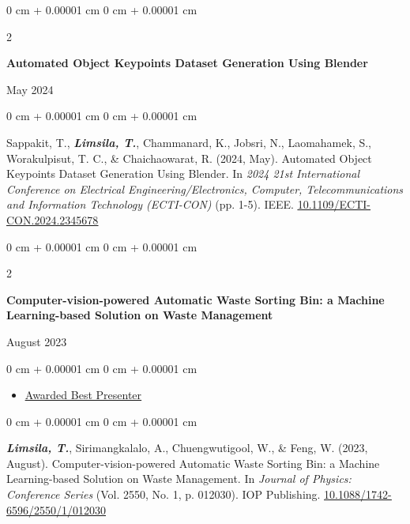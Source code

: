\documentclass[10pt, letterpaper]{article}
\newenvironment{highlights}{
    \begin{itemize}[
        topsep=0.0 cm,
        parsep=0.0 cm,
        partopsep=0pt,
        itemsep=0pt,
        leftmargin=0 cm + 10pt
    ]
}{
    \end{itemize}
} %
\newenvironment{onecolentry}{
    \begin{adjustwidth}{
        0 cm + 0.00001 cm
    }{
        0 cm + 0.00001 cm
    }
}{
    \end{adjustwidth}
} %
\newenvironment{twocolentry}[2][]{
    \onecolentry
    \def\secondColumn{#2}
    \setcolumnwidth{\fill, 4.5 cm}
    \begin{paracol}{2}
}{
    \switchcolumn \raggedleft \secondColumn
    \end{paracol}
    \endonecolentry
} %
\begin{document}
        \vspace{0.30 cm}
        
        \begin{samepage}
            \begin{twocolentry}{May 2024}
                \textbf{Automated Object Keypoints Dataset Generation Using Blender}
            \end{twocolentry}
            \vspace{0.10 cm}
            \begin{onecolentry}
                Sappakit, T., \textbf{\textit{Limsila, T.}}, Chammanard, K., Jobsri, N., Laomahamek, S., Worakulpisut, T. C., \& Chaichaowarat, R. (2024, May). Automated Object Keypoints Dataset Generation Using Blender. In \textit{2024 21st International Conference on Electrical Engineering/Electronics, Computer, Telecommunications and Information Technology (ECTI-CON)} (pp. 1-5). IEEE. \href{https://ieeexplore.ieee.org/abstract/document/10594926}{\underline{10.1109/ECTI-CON.2024.2345678}}
            \end{onecolentry}
        \end{samepage}
        
        \vspace{0.30 cm}
        
        \begin{samepage}
            \begin{twocolentry}{August 2023}
                \textbf{Computer-vision-powered Automatic Waste Sorting Bin: a Machine Learning-based Solution on Waste Management}
            \end{twocolentry}
            \begin{onecolentry}\begin{highlights}
                \item \href{https://drive.google.com/file/d/1MpDbpqGGHY5RtM_ITuSXXfoJGlBZs_xu/view?usp=drive_link}{\underline{Awarded Best Presenter}}
            \end{highlights}\end{onecolentry}
        \vspace{0.10 cm}
    
        \begin{onecolentry}
            \textbf{\textit{Limsila, T.}}, Sirimangkalalo, A., Chuengwutigool, W., \& Feng, W. (2023, August). Computer-vision-powered Automatic Waste Sorting Bin: a Machine Learning-based Solution on Waste Management. In \textit{Journal of Physics: Conference Series} (Vol. 2550, No. 1, p. 012030). IOP Publishing. \href{https://iopscience.iop.org/article/10.1088/1742-6596/2550/1/012030/meta}{\underline{10.1088/1742-6596/2550/1/012030}}
        \end{onecolentry}
    \end{samepage}
\end{document}
